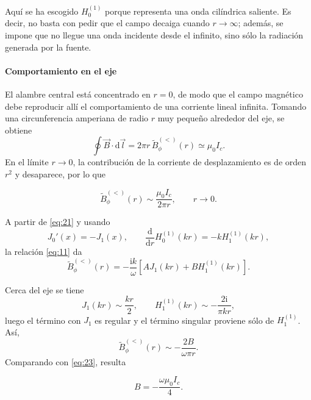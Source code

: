 \documentclass{article}
\numberwithin{equation}{section}
\newcommand{\iu}{\mathrm{i}}
\newcommand{\ud}{\mathrm{d}}
\begin{document}
Aquí se ha escogido $H_0^{(1)}$ porque representa una onda cilíndrica saliente. Es decir, no basta con pedir que el campo decaiga cuando $r\to\infty$; además, se impone que no llegue una onda incidente desde el infinito, sino sólo la radiación generada por la fuente.

\paragraph{Comportamiento en el eje}

El alambre central está concentrado en $r=0$, de modo que el campo magnético debe reproducir allí el comportamiento de una corriente lineal infinita. Tomando una circunferencia amperiana de radio $r$ muy pequeño alrededor del eje, se obtiene
\begin{equation*}
    \oint \vec B\cdot \ud\vec l=2\pi r\,\widetilde B_{\phi}^{(<)}(r)\simeq \mu_0 I_c.
\end{equation*}
En el límite $r\to 0$, la contribución de la corriente de desplazamiento es de orden $r^2$ y desaparece, por lo que

\begin{equation}\tag{23}\label{eq:23}
    \widetilde B_{\phi}^{(<)}(r)\sim \frac{\mu_0 I_c}{2\pi r},
    \qquad r\to 0.
\end{equation}

A partir de \eqref{eq:21} y usando
\begin{equation*}
    J_0'(x)=-J_1(x),
    \qquad
    \frac{\ud}{\ud r}H_0^{(1)}(kr)=-kH_1^{(1)}(kr),
\end{equation*}
la relación \eqref{eq:11} da
\begin{equation*}
    \widetilde B_{\phi}^{(<)}(r)=-\frac{\iu k}{\omega}\left[AJ_1(kr)+BH_1^{(1)}(kr)\right].
\end{equation*}

Cerca del eje se tiene
\begin{equation*}
    J_1(kr)\sim \frac{kr}{2},
    \qquad
    H_1^{(1)}(kr)\sim -\frac{2\iu}{\pi kr},
\end{equation*}
luego el término con $J_1$ es regular y el término singular proviene sólo de $H_1^{(1)}$. Así,
\begin{equation*}
    \widetilde B_{\phi}^{(<)}(r)\sim -\frac{2B}{\omega\pi r}.
\end{equation*}
Comparando con \eqref{eq:23}, resulta

\begin{equation}\tag{24}\label{eq:24}
    B=-\frac{\omega\mu_0 I_c}{4}.
\end{equation}
\end{document}
